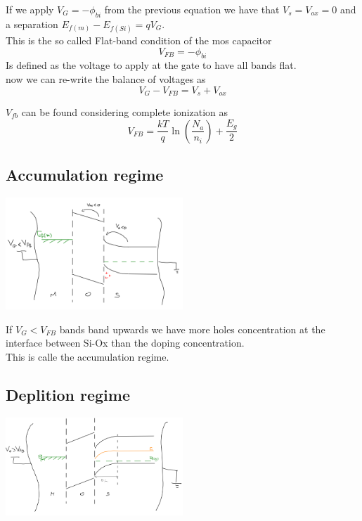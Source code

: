 If we apply $V_G=-\phi_{bi}$ from the previous equation we have that $V_s=V_{ox}=0$ and a separation $E_{f(m)}-E_{f(Si)}=qV_G$.\\
This is the so called Flat-band condition of the mos capacitor 
\begin{equation}
V_{FB}=-\phi_{bi}
\end{equation}
Is defined as the voltage to apply at the gate to have all bands flat.\\
now we can re-write the balance of voltages as
\begin{equation}
V_G-V_{FB}=V_s+V_{ox}
\end{equation}

$V_{fb}$ can be found considering complete ionization as
\begin{equation}
V_{FB}=\frac{kT}{q}\ln(\frac{N_a}{n_i})+\frac{E_g}{2}
\end{equation}
\subsection{Accumulation regime}
\centering
\includegraphics[width=0.5\textwidth]{mos_accum.png}\\
\raggedright


If $V_G<V_{FB}$ bands band upwards we have more holes concentration at the interface between Si-Ox than the doping concentration. \\
This is calle the accumulation regime.
\subsection{Deplition regime} 
\centering
\includegraphics[width=0.5\textwidth]{mos_depl.png}\\
\raggedright


